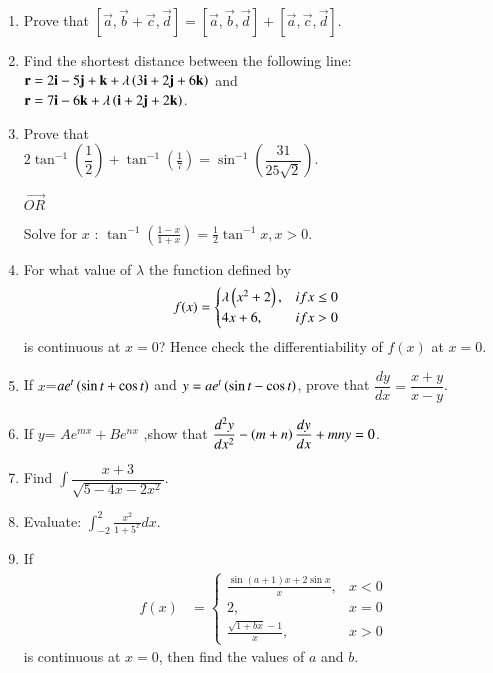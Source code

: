 \documentclass[journal,12pt,twocolumn]{IEEEtran}
\theoremstyle{remark}
\begin{document}
\begin{enumerate}
\item Prove that $\left [ \vec{a},\vec{b} + \vec{c},\vec{d} \right ] = \left [ \vec{a},\vec{b},\vec{d} \right] + \left[ \vec{a},\vec{c},\vec{d} \right]$.\\

\item Find the shortest distance between the following line:
$\mathbf{r}=2\mathbf{i}-5\mathbf{j}+\mathbf{k}+\lambda\left(3\mathbf{i}+2\mathbf{j}+6\mathbf{k}\right)$ and \\
$\mathbf{r}=7\mathbf{i}-6\mathbf{k}+\lambda\left(\mathbf{i}+2\mathbf{j}+2\mathbf{k}\right)$.

\item Prove that \\
$2\tan^{-1}{(\dfrac{1}{2})} + \tan^{-1}{(\frac{1}{7})} = \sin^{-1}{(\dfrac{31}{25\sqrt{2}})}$.
\begin{center} $\vec{OR}$ \\ \end{center}
Solve for $x$ : $\tan^{-1}{(\frac{1-x}{1+x})}= \frac{1}{2} \tan^{-1}{x} , x>0$.\\

\item For what value of $\lambda$ the function defined by 
\begin{align} f(x) &= \begin{cases}\lambda\left(x^2 +2\right),&if x\leq0 \\ 4x+6 , &if x>0 \end{cases} \end{align}
is continuous at $x=0$? Hence check the differentiability of $f(x)$ at $x=0$.\\

\item If $x$=$ae^t\left(\sin{t}+\cos{t}\right)$ and $y=ae^t \left(\sin{t}-\cos{t}\right)$, prove that $\dfrac{dy}{dx} = \dfrac{x+y}{x-y}$.\\

\item If $y$= $Ae^{mx}+Be^{nx}$ ,show that $\dfrac{d^2 y}{dx^2}-\left(m+n\right)\dfrac{dy}{dx}+mny = 0$.\\

\item Find $\int \dfrac{x+3}{\sqrt{5-4x-2x^2}}$.\\

\item Evaluate: $\int_{-2}^{2}\frac{x^2}{1+5^x}dx$.\\

\item If \begin{align}f(x) &= \begin{cases}\frac{\sin(a+1)x + 2\sin x}{x}, &x<0\\ 2, &x=0 \\ \frac{\sqrt{1+bx}-1}{x}, &x>0 \end{cases}\end{align} is continuous at $x=0$, then find the values of $a$ and $b$.\\


\end{enumerate}
\end{document}
